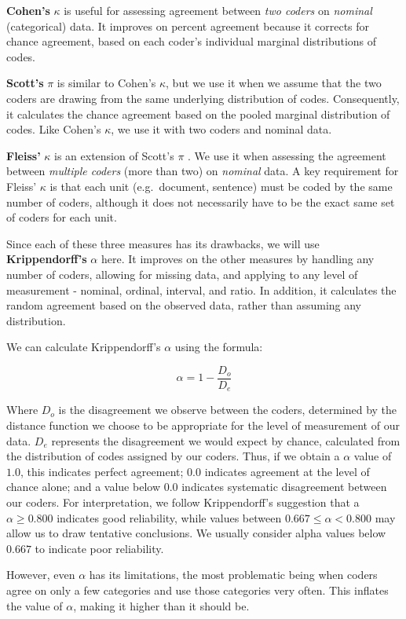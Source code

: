 \documentclass[
]{book}
\begin{document}
\textbf{Cohen's} \(\kappa\) is useful for assessing agreement between \emph{two coders} on \emph{nominal} (categorical) data. It improves on percent agreement because it corrects for chance agreement, based on each coder's individual marginal distributions of codes.

\textbf{Scott's} \(\pi\) is similar to Cohen's \(\kappa\), but we use it when we assume that the two coders are drawing from the same underlying distribution of codes. Consequently, it calculates the chance agreement based on the pooled marginal distribution of codes. Like Cohen's \(\kappa\), we use it with two coders and nominal data.

\textbf{Fleiss'} \(\kappa\) is an extension of Scott's \(\pi\) . We use it when assessing the agreement between \emph{multiple coders} (more than two) on \emph{nominal} data. A key requirement for Fleiss' \(\kappa\) is that each unit (e.g.~document, sentence) must be coded by the same number of coders, although it does not necessarily have to be the exact same set of coders for each unit.

Since each of these three measures has its drawbacks, we will use \textbf{Krippendorff's} \(\alpha\) here. It improves on the other measures by handling any number of coders, allowing for missing data, and applying to any level of measurement - nominal, ordinal, interval, and ratio. In addition, it calculates the random agreement based on the observed data, rather than assuming any distribution.

We can calculate Krippendorff's \(\alpha\) using the formula:

\[\alpha = 1 - \frac{D_o}{D_e}\]

Where \(D_o\) is the disagreement we observe between the coders, determined by the distance function we choose to be appropriate for the level of measurement of our data. \(D_e\) represents the disagreement we would expect by chance, calculated from the distribution of codes assigned by our coders. Thus, if we obtain a \(\alpha\) value of \(1.0\), this indicates perfect agreement; \(0.0\) indicates agreement at the level of chance alone; and a value below \(0.0\) indicates systematic disagreement between our coders. For interpretation, we follow Krippendorff's suggestion that a \(\alpha \ge 0.800\) indicates good reliability, while values between \(0.667 \le \alpha < 0.800\) may allow us to draw tentative conclusions. We usually consider alpha values below \(0.667\) to indicate poor reliability.

However, even \(\alpha\) has its limitations, the most problematic being when coders agree on only a few categories and use those categories very often. This inflates the value of \(\alpha\), making it higher than it should be.
\end{document}
